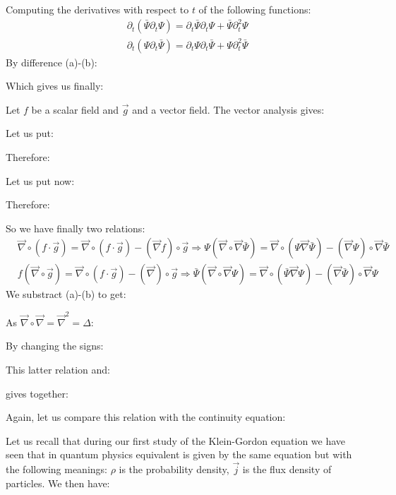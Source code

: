 	Computing the derivatives with respect to $t$ of the following functions:
	\begin{subequations}
	\label{equations}
	\begin{align}
	  \label{eq:a}
	  &\partial_t(\bar{\Psi}\partial_t\Psi)=\partial_t\bar{\Psi}\partial_t\Psi+\bar{\Psi}\partial_t^2\Psi \\
	  \label{eq:b}
	  &\partial_t(\Psi\partial_t\bar{\Psi})=\partial_t\Psi\partial_t\bar{\Psi}+\Psi\partial_t^2\bar{\Psi}
	\end{align}
	\end{subequations}
	By difference (a)-(b):
	
	Which gives us finally:
	
	Let $f$ be a scalar field and $\vec{g}$ and a vector field. The vector analysis gives:
	
	Let us put:
	
	Therefore:
	
	Let us put now:
	
	Therefore:
	
	So we have finally two relations:
	\begin{subequations}
	\label{equations}
	\begin{align}
	  \label{eq:a}
	  &\vec{\nabla}\circ(f\cdot \vec{g})=\vec{\nabla}\circ(f\cdot \vec{g})-(\vec{\nabla} f)\circ \vec{g}\Rightarrow \Psi(\vec{\nabla}\circ\vec{\nabla}\bar{\Psi})=\vec{\nabla}\circ(\Psi\vec{\nabla}\bar{\Psi})-(\vec{\nabla}\Psi)\circ\vec{\nabla}\bar{\Psi}\\
	  \label{eq:b}
	  &f(\vec{\nabla}\circ\vec{g})=\vec{\nabla}\circ(f\cdot \vec{g})-(\vec{\nabla})\circ\vec{g}\Rightarrow \bar{\Psi}(\vec{\nabla}\circ\vec{\nabla}\Psi)=\vec{\nabla}\circ(\bar{\Psi}\vec{\nabla}\Psi)-(\vec{\nabla}\bar{\Psi})\circ\vec{\nabla}\Psi
	\end{align}
	\end{subequations}
	We substract (a)-(b) to get:
	
	As $\vec{\nabla}\circ\vec{\nabla}=\vec{\nabla}^2=\Delta$:
	
	By changing the signs:
	
	This latter relation and:
	
	gives together:
	
	Again, let us compare this relation with the continuity equation:
	
	Let us recall that during our first study of the Klein-Gordon equation we have seen that in quantum physics equivalent is given by the same equation but with the following meanings: $\rho$ is the probability density, $\vec{j}$ is the flux density of particles.
	We then have:
	
